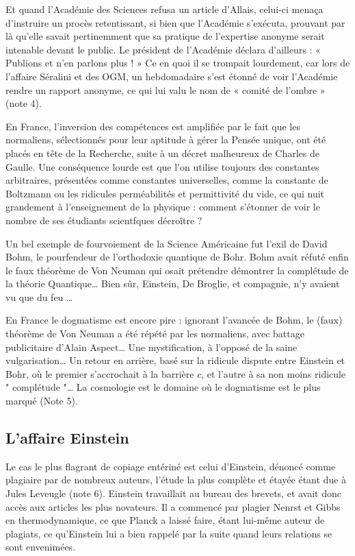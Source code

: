 \documentclass[a4paper,12pt]{article}
\begin{document}
Et quand l'Académie des Sciences refusa un article d'Allais, celui-ci menaça d'instruire un procès retentissant, si bien que l'Académie s'exécuta, prouvant par là qu'elle savait pertinemment que sa pratique de l'expertise anonyme serait intenable devant le public. Le président de l'Académie déclara d'ailleurs : « Publions et n'en parlons plus ! » Ce en quoi il se trompait lourdement, car lors de l’affaire Séralini et des OGM, un hebdomadaire s’est étonné de voir l’Académie rendre un rapport anonyme, ce qui lui valu le nom de « comité de l'ombre » (note 4).

En France, l'inversion des compétences est amplifiée par le fait que les normaliens, sélectionnés pour leur aptitude à gérer la Pensée unique, ont été placés en tête de la Recherche, suite à un décret malheureux de Charles de Gaulle. Une conséquence lourde est que l'on utilise toujours des constantes arbitraires, présentées comme constantes universelles, comme la constante de Boltzmann ou les ridicules perméabilités et permittivité du vide, ce qui nuit grandement à l'enseignement de la physique : comment s’étonner de voir le nombre de ses étudiants scientfques décroître ?

Un bel exemple de fourvoiement de la Science Américaine fut l’exil de David Bohm, le pourfendeur de l’orthodoxie quantique de Bohr. Bohm avait réfuté enfin le faux théorème de Von Neuman qui osait prétendre démontrer la complétude de la théorie Quantique… Bien sûr, Einstein, De Broglie, et compagnie, n’y avaient vu que du feu … 


En France le dogmatisme est encore pire : ignorant l’avancée de Bohm, le (faux) théorème de Von Neuman a été répété par les normaliens,  avec battage publicitaire d’Alain Aspect… Une mystification, à l’opposé de la saine vulgarisation… Un retour en arrière, basé sur la ridicule dispute entre Einstein et Bohr, où le premier s’accrochait à la barrière $c$, et l’autre à sa non moins ridicule " complétude "… La cosmologie est le domaine où le dogmatisme est le plus marqué (Note 5).







\subsection {L'affaire Einstein}

 Le cas le plus flagrant de copiage entériné est celui d’Einstein, dénoncé comme plagiaire par de nombreux auteurs, l’étude la plus complète et étayée étant due à Jules Leveugle (note 6). Einstein travaillait au bureau des brevets, et avait donc accès aux articles les plus novateurs. Il a commencé par plagier Nenrst et Gibbs en thermodynamique, ce que Planck a laissé faire, étant lui-même auteur de plagiats, ce qu’Einstein lui a bien rappelé par la suite quand leurs relations se sont envenimées.
\end{document}
